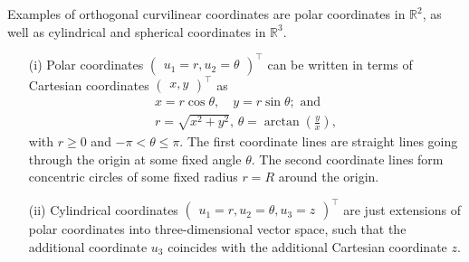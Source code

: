 {
\color{blue}
\bexample

Examples of orthogonal curvilinear coordinates
are polar coordinates in $\mathbb{R}^2$,
as well as cylindrical and spherical coordinates in $\mathbb{R}^3$.

\begin{itemize}
\item[(i)]
Polar coordinates
$\begin{pmatrix}
u_1=r, u_2=\theta
\end{pmatrix}^\intercal$
can be written in terms of Cartesian coordinates
$\begin{pmatrix}
x,y \end{pmatrix}^\intercal$ as
\begin{equation}
\begin{split}
x = r \cos \theta ,\quad
y = r \sin \theta   ;\text{ and}\quad   \\
r=\sqrt{x^2+y^2}\text{, }
\theta = \arctan \left(\frac{y}{x}\right)
,
\end{split}
\label{2018-mm-ch-pc}
\end{equation}
with $r \ge 0$
and $-\pi < \theta \le \pi$.
The first coordinate lines
are straight lines going through the origin at some fixed angle $\theta $.
The second coordinate lines
form concentric circles of some fixed radius $r=R$ around the origin.


\item[(ii)]
Cylindrical coordinates
$\begin{pmatrix}
u_1=r, u_2=\theta, u_3=z
\end{pmatrix}^\intercal$
are just extensions of polar coordinates into three-dimensional vector space, such that the additional coordinate
$u_3$ coincides with the additional Cartesian coordinate $z$.


\end{itemize}}
